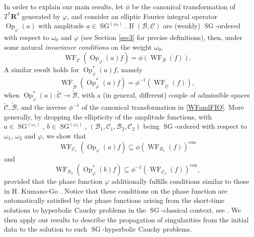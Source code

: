 \documentclass[12pt,a4paper,reqno]{amsart}
\numberwithin{equation}{section}
\numberwithin{thm}{section}
\theoremstyle{definition}
\theoremstyle{remark}
\begin{document}
In order to explain our main results, let $\phi$ be the canonical
transformation of $T^*{\mathbf R^{d}}$ generated by ${\varphi}$, 
and consider an elliptic
Fourier integral operator ${\operatorname{Op}} _{\varphi} (a)$ with amplitude $a\in{\operatorname{SG}} ^{(\omega _0)}$.
If $({{\mathcal B}} ,{{\mathcal C}} )$ are (weakly) ${\operatorname{SG}}$-ordered with respect to  $\omega _0$ and
$\varphi$ (see Section \ref{sec3} for precise definitions), then, under some natural 
\textit{invariance conditions} on the weight $\omega_0$,
\begin{equation}\label{WFandFIO}
{\operatorname{WF}} _{{\mathcal C}}({\operatorname{Op}} _{\varphi} (a)f) = \phi ({\operatorname{WF}} _{{\mathcal B}}(f)). 
\end{equation}
A similar result holds for ${\operatorname{Op}}_{\varphi}^*(a)f$, namely
\begin{equation}\label{WFandFIObis}
{\operatorname{WF}} _{\widetilde{{\mathcal B}}}({\operatorname{Op}} _{\varphi}^* (a)f) = \phi^{-1} ({\operatorname{WF}} _{\widetilde{{\mathcal C}}}(f)), 
\end{equation}
when ${\operatorname{Op}}_{\varphi}^*(a)\colon\widetilde{{\mathcal C}}\to\widetilde{{\mathcal B}}$, with a
(in general, different) couple of admissible spaces $\widetilde{{\mathcal C}},
\widetilde{{\mathcal B}}$, and the inverse $\phi^{-1}$ of the canonical
transformation in \eqref{WFandFIO}. More generally,
by dropping the ellipticity of the amplitude functions, with
$a\in{\operatorname{SG}}^{(\omega_1)}$, $b\in{\operatorname{SG}}^{(\omega_2)}$, $({{\mathcal B}}_1 ,{{\mathcal C}}_1,
{{\mathcal B}}_2, {{\mathcal C}}_2 )$ being ${\operatorname{SG}}$-ordered with respect to
$\omega_1$, $\omega_2$ and $\varphi$, we show that
\begin{equation}\label{WFandFIOter}
{\operatorname{WF}} _{{{\mathcal C}}_1}({\operatorname{Op}} _{\varphi} (a)f) \subseteq \phi ({\operatorname{WF}} _{{{\mathcal B}}_1}(f))^\mathrm{con}
\end{equation}
and
\begin{equation}\label{WFandFIOquater}
{\operatorname{WF}} _{{{{\mathcal B}}_2}}({\operatorname{Op}} _{\varphi}^* (b)f) \subseteq \phi^{-1} ({\operatorname{WF}} _{{{{\mathcal C}}_2}}(f))^\mathrm{con}, 
\end{equation}
provided that the phase function $\varphi$ additionally fulfills conditions
similar to those in H. Kumano-Go \cite{Ku}. Notice that these conditions on the phase function
are automatically satisfied by the phase functions arising from the
short-time solutions to hyperbolic Cauchy problems in the ${\operatorname{SG}}$-classical context,
see \cite{Co, coriasco2, CoPa, CoRo}. We then apply our results to
describe the propagation of singularities from the initial data to the
solution to such ${\operatorname{SG}}$-hyperbolic Cauchy problems.
\end{document}
